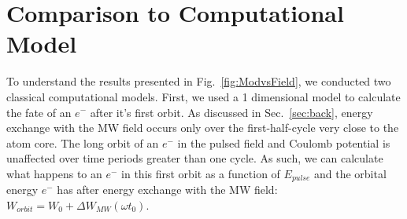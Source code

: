 \documentclass[aps,pra,preprint,groupedaddress]{revtex4-1}
\begin{document}










\section{\label{sec:disc} Comparison to Computational Model}

To understand the results presented in Fig.~\ref{fig:ModvsField}, we conducted two classical computational models. First, we used a 1 dimensional model to calculate the fate of an $e^-$ after it's first orbit. As discussed in Sec.~\ref{sec:back}, energy exchange with the MW field occurs only over the first-half-cycle very close to the atom core. The long orbit of an $e^-$ in the pulsed field and Coulomb potential is unaffected over time periods greater than one cycle. As such, we can calculate what happens to an $e^-$ in this first orbit as a function of $E_{pulse}$ and the orbital energy $e^-$ has after energy exchange with the MW field: $W_{orbit} = W_0 + \Delta W_{MW}(\omega t_0)$.
\end{document}
